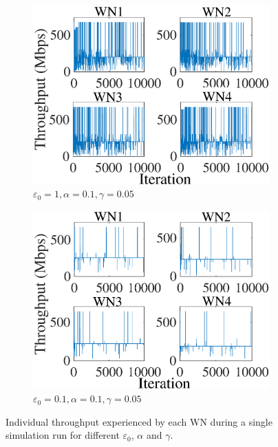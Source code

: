 \documentclass[conference]{IEEEtran}
\begin{document}
\begin{figure}[]
\begin{subfigure}[b]{0.225\textwidth}
			\includegraphics[width=\textwidth]{images/e_1_a_01_g_005_ind_tpt}
			\caption{$\varepsilon_0=1, \alpha=0.1, \gamma=0.05$}
			\label{fig:e_1_a_01_g_005_ind_tpt}
		\end{subfigure}
		\begin{subfigure}[b]{0.225\textwidth}
			\includegraphics[width=\textwidth]{images/e_01_a_01_g_005_ind_tpt}
			\caption{$\varepsilon_0=0.1, \alpha=0.1, \gamma=0.05$}
			\label{fig:e_01_a_01_g_005_ind_tpt}
		\end{subfigure}
		\caption{Individual throughput experienced by each WN during a single simulation run for different $\varepsilon_0$, $\alpha$ and $\gamma$.}
		\label{fig:ql_params_eval_individual_tpt}
	\end{figure}
	
\end{document}
